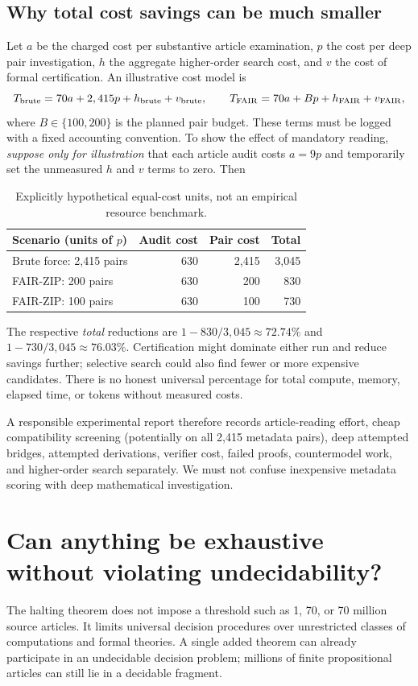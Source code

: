 \documentclass[11pt,letterpaper]{article}
\begin{document}
\subsection{Why total cost savings can be much smaller}
Let $a$ be the charged cost per substantive article examination, $p$ the cost per deep pair investigation, $h$ the aggregate higher-order search cost, and $v$ the cost of formal certification. An illustrative cost model is
\[
T_{\rm brute}=70a+2,415p+h_{\rm brute}+v_{\rm brute},\qquad
T_{\rm FAIR}=70a+Bp+h_{\rm FAIR}+v_{\rm FAIR},
\]
where $B\in\{100,200\}$ is the planned pair budget. These terms must be logged with a fixed accounting convention. To show the effect of mandatory reading, \emph{suppose only for illustration} that each article audit costs $a=9p$ and temporarily set the unmeasured $h$ and $v$ terms to zero. Then
\begin{table}[h!]
\centering\small
\begin{tabularx}{\linewidth}{>{\raggedright\arraybackslash}X r r r}
\toprule
Scenario (units of $p$) & Audit cost & Pair cost & Total\\
\midrule
Brute force: 2,415 pairs & 630 & 2,415 & 3,045\\
FAIR-ZIP: 200 pairs & 630 & 200 & 830\\
FAIR-ZIP: 100 pairs & 630 & 100 & 730\\
\bottomrule
\end{tabularx}
\caption{Explicitly hypothetical equal-cost units, not an empirical resource benchmark.}
\end{table}
The respective \emph{total} reductions are $1-830/3,045\approx72.74\%$ and $1-730/3,045\approx76.03\%$. Certification might dominate either run and reduce savings further; selective search could also find fewer or more expensive candidates. There is no honest universal percentage for total compute, memory, elapsed time, or tokens without measured costs.

A responsible experimental report therefore records article-reading effort, cheap compatibility screening (potentially on all 2,415 metadata pairs), deep attempted bridges, attempted derivations, verifier cost, failed proofs, countermodel work, and higher-order search separately. We must not confuse inexpensive metadata scoring with deep mathematical investigation.

\section{Can anything be exhaustive without violating undecidability?}
The halting theorem does not impose a threshold such as 1, 70, or 70 million source articles. It limits universal decision procedures over unrestricted classes of computations and formal theories. A single added theorem can already participate in an undecidable decision problem; millions of finite propositional articles can still lie in a decidable fragment.
\end{document}
